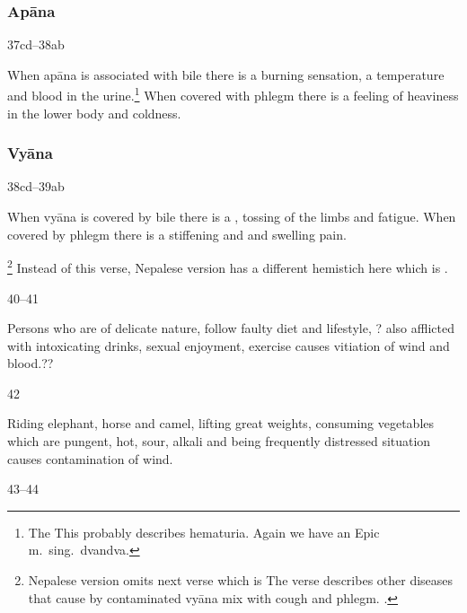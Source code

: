 \begin{translation}
\subsubsection{Apāna}

\item[37cd--38ab]

	When apāna is associated with bile  there is a burning sensation, a temperature 
	and blood in the urine.\footnote{The This probably describes hematuria.  Again 
	we have an Epic m.\ sing.\ dvandva.}
     When  covered with phlegm there is a feeling of
	heaviness in the lower body and coldness.



\subsubsection{Vyāna}

\item[38cd--39ab]

When vyāna is covered by bile there is a ,
tossing of the limbs and fatigue.  When covered by phlegm there is a
stiffening and  and swelling pain.

	\footnote{Nepalese version omits next verse which is
	 The verse describes other diseases that cause by contaminated vyāna 	mix with cough and phlegm. \cite[264]{vulgate}.} Instead of this verse, Nepalese version has a different hemistich here which is .  


\item[40--41]

	Persons who are of delicate nature, follow faulty diet and lifestyle, ?
	also afflicted with intoxicating drinks, sexual enjoyment,
	exercise causes vitiation of wind and blood.??

\item[42]

	Riding elephant, horse and camel, lifting great weights, consuming
	vegetables which are pungent, hot, sour, alkali and being frequently
	distressed situation causes contamination of wind. 

\item[43--44]


\end{translation}
